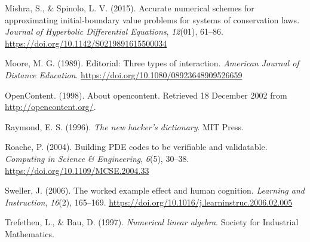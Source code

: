 \documentclass[]{book}
\begin{document}
\hypertarget{ref-mishra2015accurate}{}
Mishra, S., \& Spinolo, L. V. (2015). Accurate numerical schemes for
approximating initial-boundary value problems for systems of
conservation laws. \emph{Journal of Hyperbolic Differential Equations},
\emph{12}(01), 61--86. \url{https://doi.org/10.1142/S0219891615500034}

\hypertarget{ref-moore1989three}{}
Moore, M. G. (1989). Editorial: Three types of interaction.
\emph{American Journal of Distance Education}.
\url{https://doi.org/10.1080/08923648909526659}

\hypertarget{ref-OC1998}{}
OpenContent. (1998). About opencontent. Retrieved 18 December 2002 from
\url{http://opencontent.org/}.

\hypertarget{ref-raymond1996new}{}
Raymond, E. S. (1996). \emph{The new hacker's dictionary}. MIT Press.

\hypertarget{ref-roache2004bpc}{}
Roache, P. (2004). Building PDE codes to be verifiable and validatable.
\emph{Computing in Science \& Engineering}, \emph{6}(5), 30--38.
\url{https://doi.org/10.1109/MCSE.2004.33}

\hypertarget{ref-sweller2006worked}{}
Sweller, J. (2006). The worked example effect and human cognition.
\emph{Learning and Instruction}, \emph{16}(2), 165--169.
\url{https://doi.org/10.1016/j.learninstruc.2006.02.005}

\hypertarget{ref-trefethen1997numerical}{}
Trefethen, L., \& Bau, D. (1997). \emph{Numerical linear algebra}.
Society for Industrial Mathematics.
\end{document}
